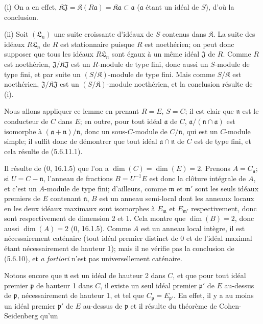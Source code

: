 \begin{example}[5.6.11]
(i) On a en effet,
$\mathfrak K\mathfrak J=\mathfrak K(R\mathfrak a)
=\mathfrak K\mathfrak a\subset\mathfrak a$
($\mathfrak a$ étant un idéal de $S$), d'où la conclusion.

(ii) Soit $(\mathfrak L_n)$ une suite croissante d'idéaux de $S$ contenus
dans $\mathfrak K$. La suite des idéaux $R\mathfrak L_n$ de $R$ est
stationnaire puisque $R$ est noethérien; on peut donc supposer que tous les
idéaux $R\mathfrak L_n$ sont égaux à un même idéal $\mathfrak J$ de $R$.
Comme $R$ est noethérien, $\mathfrak J/\mathfrak K\mathfrak J$ est un
$R$-module de type fini, donc aussi un $S$-module de type fini, et par suite
un $(S/\mathfrak K)$-module de type fini. Mais comme $S/\mathfrak K$ est
noethérien, $\mathfrak J/\mathfrak K\mathfrak J$ est un
$(S/\mathfrak K)$-module noethérien, et la conclusion résulte de (i).

Nous allons appliquer ce lemme en prenant $R=E$, $S=C$; il est clair que
$\mathfrak n$ est le conducteur de $C$ dans $E$; en outre, pour tout idéal
$\mathfrak a$ de $C$,
$\mathfrak a/(\mathfrak n\cap\mathfrak a)$ est isomorphe à
$(\mathfrak a+\mathfrak n)/\mathfrak n$, donc un sous-$C$-module de
$C/\mathfrak n$, qui est un $C$-module simple; il suffit donc de démontrer
que tout idéal $\mathfrak a\cap\mathfrak n$ de $C$ est de type fini, et cela
résulte de (5.6.11.1).

Il résulte de (0, 16.1.5) que l'on a $\dim(C)=\dim(E)=2$. Prenons
$A=C_{\mathfrak n}$; si $U=C-\mathfrak n$, l'anneau de fractions
$B=U^{-1}E$ est donc la clôture intégrale de $A$, et c'est un $A$-module de
type fini; d'ailleurs, comme $\mathfrak m$ et $\mathfrak m'$ sont les seuls
idéaux premiers de $E$ contenant $\mathfrak n$, $B$ est un anneau semi-local
dont les anneaux locaux en les deux idéaux maximaux sont isomorphes à
$E_{\mathfrak m}$ et $E_{\mathfrak m'}$ respectivement, donc sont
respectivement de dimension 2 et 1. Cela montre que $\dim(B)=2$, donc aussi
$\dim(A)=2$ (0, 16.1.5). Comme $A$ est un anneau local intègre, il est
nécessairement caténaire (tout idéal premier distinct de 0 et de l'idéal
maximal étant nécessairement de hauteur 1); mais il ne vérifie pas la
conclusion de (5.6.10), et \emph{a fortiori} n'est pas universellement
caténaire.

Notons encore que $\mathfrak n$ est un idéal de hauteur 2 dans $C$, et que
pour tout idéal premier $\mathfrak p$ de hauteur 1 dans $C$, il existe un
seul idéal premier $\mathfrak p'$ de $E$ au-dessus de $\mathfrak p$,
nécessairement de hauteur 1, et tel que
$C_{\mathfrak p}=E_{\mathfrak p'}$. En effet, il y a au moins un idéal
premier $\mathfrak p'$ de $E$ au-dessus de $\mathfrak p$ et il résulte du
théorème de Cohen-Seidenberg qu'un


\end{example}
